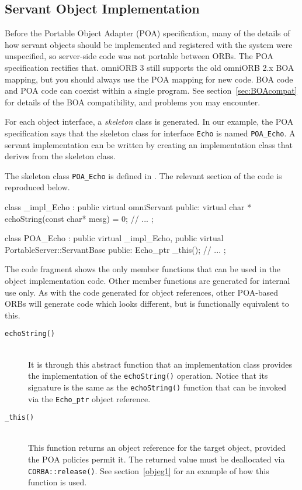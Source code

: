 \documentclass[11pt,twoside,a4paper]{book}
\newcommand{\type}[1]{\texttt{#1}}
\newcommand{\intf}[1]{\texttt{#1}}
\newcommand{\op}[1]{\texttt{#1()}}
\newcommand{\term}[1]{\textit{#1}}
\newcommand{\file}{\begingroup \urlstyle{tt}\Url}
\newcommand{\dsc}{\discretionary{}{}{}}
\begin{document}
\subsection{Servant Object Implementation}
\label{stubobjimpl}

Before the Portable Object Adapter (POA) specification, many of the
details of how servant objects should be implemented and registered
with the system were unspecified, so server-side code was not portable
between ORBs. The POA specification rectifies that. omniORB 3 still
supports the old omniORB 2.x BOA mapping, but you should always use
the POA mapping for new code. BOA code and POA code can coexist within
a single program. See section~\ref{sec:BOAcompat} for details of the
BOA compatibility, and problems you may encounter.

For each object interface, a \term{skeleton} class is generated.  In
our example, the POA specification says that the skeleton class for
interface \intf{Echo} is named \type{POA\_Echo}. A servant
implementation can be written by creating an implementation class that
derives from the skeleton class.

The skeleton class \type{POA\_Echo} is defined in \file{echo.hh}. The
relevant section of the code is reproduced below.

\begin{cxxlisting}
class _impl_Echo :
  public virtual omniServant
{
public:
  virtual char * echoString(const char*  mesg) = 0;
  // ...
};

class POA_Echo :
  public virtual _impl_Echo,
  public virtual PortableServer::ServantBase
{
public:
  Echo_ptr _this();
  // ...
};
\end{cxxlisting}

The code fragment shows the only member functions that can be used in
the object implementation code. Other member functions are generated
for internal use only. As with the code generated for object
references, other POA-based ORBs will generate code which looks
different, but is functionally equivalent to this.


\begin{description}

\item[\op{echoString}]\mbox{}\\
%
It is through this abstract function that an implementation class
provides the implementation of the \op{echoString} operation. Notice
that its signature is the same as the \op{echoString} function that
can be invoked via the \type{Echo\_ptr} object reference.

\item[\op{\_this}]\mbox{}\\
%
This function returns an object reference for the target object,
provided the POA policies permit it. The returned value must be
deallocated via \op{CORBA::\dsc{}release}.  See section~\ref{objeg1}
for an example of how this function is used.

\end{description}
\end{document}
